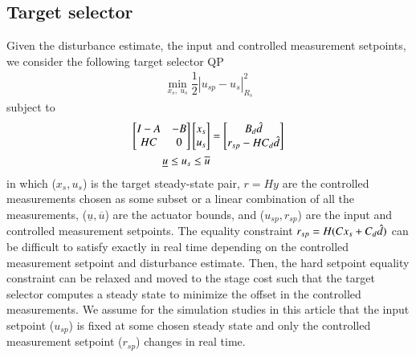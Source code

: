 \documentclass[preprint,5p, twocolumn, authoryear]{elsarticle}
\begin{document}
\subsection{Target selector}
Given the disturbance estimate, the input and controlled measurement setpoints,
we consider the following target selector QP
\begin{align}
    \min_{x_s, \ u_s}  \dfrac{1}{2} |u_{sp} - u_s|^2_{R_s}
\end{align}
subject to
\begin{align}  
    \begin{bmatrix}
        I -A & -B \\
        HC & 0
    \end{bmatrix} \begin{bmatrix}
        x_s \\
        u_s
    \end{bmatrix} &= \begin{bmatrix}
        B_d\hat{d} \\
        r_{sp} - HC_d\hat{d}
    \end{bmatrix} \\
    \underline{u} \leq u_s \leq \overline{u}
\end{align}
in which ($x_s, u_s$) is the target steady-state pair, $r=Hy$ are the controlled
measurements chosen as some subset or a linear combination of all the
measurements, ($\underline{u}, \overline{u}$) are the actuator bounds, and
($u_{sp}, r_{sp}$) are the input and controlled measurement setpoints. The
equality constraint $r_{sp} = H(Cx_s + C_d\hat{d})$ can be difficult to satisfy
exactly in real time depending on the controlled measurement setpoint and
disturbance estimate. Then, the hard setpoint equality constraint can be relaxed
and moved to the stage cost such that the target selector computes a steady
state to minimize the offset in the controlled measurements. We assume for the
simulation studies in this article that the input setpoint ($u_{sp}$) is fixed
at some chosen steady state and only the controlled measurement setpoint
($r_{sp}$) changes in real time.
\end{document}
